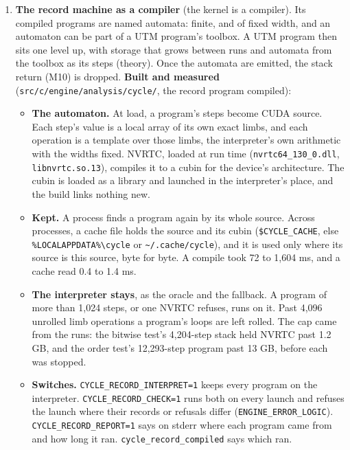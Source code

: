 \begin{enumerate}
\item \textbf{The record machine as a compiler} (the kernel is a compiler). Its compiled programs are named automata: finite, and of fixed width, and an automaton can be part of a UTM program's toolbox. A UTM program then sits one level up, with storage that grows between runs and automata from the toolbox as its steps (theory). Once the automata are emitted, the stack return (M10) is dropped. \textbf{Built and measured} (\texttt{src/\allowbreak{}c/\allowbreak{}engine/\allowbreak{}analysis/\allowbreak{}cycle/\allowbreak{}}, the record program compiled):

\begin{itemize}
\item \textbf{The automaton.} At load, a program's steps become CUDA source. Each step's value is a local array of its own exact limbs, and each operation is a template over those limbs, the interpreter's own arithmetic with the widths fixed. NVRTC, loaded at run time (\texttt{nvrtc64\_\allowbreak{}130\_\allowbreak{}0.\allowbreak{}dll}, \texttt{libnvrtc.\allowbreak{}so.\allowbreak{}13}), compiles it to a cubin for the device's architecture. The cubin is loaded as a library and launched in the interpreter's place, and the build links nothing new.
\item \textbf{Kept.} A process finds a program again by its whole source. Across processes, a cache file holds the source and its cubin (\texttt{\$CYCLE\_\allowbreak{}CACHE}, else \texttt{\%LOCALAPPDATA\%\textbackslash{}cycle} or \texttt{\textasciitilde{}/\allowbreak{}.\allowbreak{}cache/\allowbreak{}cycle}), and it is used only where its source is this source, byte for byte. A compile took 72 to 1,604 ms, and a cache read 0.4 to 1.4 ms.
\item \textbf{The interpreter stays}, as the oracle and the fallback. A program of more than 1,024 steps, or one NVRTC refuses, runs on it. Past 4,096 unrolled limb operations a program's loops are left rolled. The cap came from the runs: the bitwise test's 4,204-step stack held NVRTC past 1.2 GB, and the order test's 12,293-step program past 13 GB, before each was stopped.
\item \textbf{Switches.} \texttt{CYCLE\_\allowbreak{}RECORD\_\allowbreak{}INTERPRET=1} keeps every program on the interpreter. \texttt{CYCLE\_\allowbreak{}RECORD\_\allowbreak{}CHECK=1} runs both on every launch and refuses the launch where their records or refusals differ (\texttt{ENGINE\_\allowbreak{}ERROR\_\allowbreak{}LOGIC}). \texttt{CYCLE\_\allowbreak{}RECORD\_\allowbreak{}REPORT=1} says on stderr where each program came from and how long it ran. \texttt{cycle\_\allowbreak{}record\_\allowbreak{}compiled} says which ran.

\end{itemize}
\end{enumerate}
